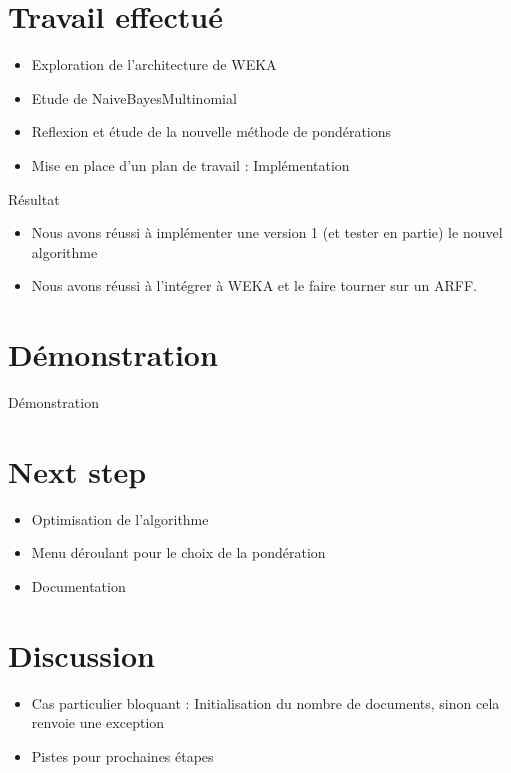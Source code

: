 \documentclass[12pt]{beamer}
\begin{document}
\section{Travail effectué}

\begin{frame}

\begin{itemize}
\item Exploration de l'architecture de WEKA
\item Etude de NaiveBayesMultinomial
\item Reflexion et étude de la nouvelle méthode de pondérations
\item Mise en place d'un plan de travail : Implémentation
\end{itemize}
\begin{block}{Résultat}
\begin{itemize}
\item Nous avons réussi à implémenter une version 1 (et tester en partie) le nouvel algorithme
\item Nous avons réussi à l'intégrer à WEKA et le faire tourner sur un ARFF.
\end{itemize}
\end{block}

\end{frame}
\section{Démonstration}

\begin{frame}

\begin{center}
\huge Démonstration

\end{center}
\end{frame}
\section{Next step}
\begin{frame}

\begin{itemize}
\item Optimisation de l'algorithme
\item Menu déroulant pour le choix de la pondération
\item Documentation
\end{itemize}
\end{frame}

\section{Discussion}
\begin{frame}

\begin{itemize}
\item Cas particulier bloquant : Initialisation du nombre de documents, sinon cela renvoie une exception
\item Pistes pour prochaines étapes
\end{itemize}


\end{frame}
\end{document}

